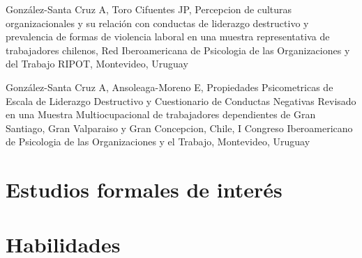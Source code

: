 \documentclass[11pt,a4paper,]{awesome-cv}
\begin{document}
\begin{cventries}
{\begin{cvitems}
\item González-Santa Cruz A, Toro Cifuentes JP, Percepcion de culturas organizacionales y su relación con conductas de liderazgo destructivo y prevalencia de formas de violencia laboral en una muestra representativa de trabajadores chilenos, Red Iberoamericana de Psicologia de las Organizaciones y del Trabajo RIPOT, Montevideo, Uruguay
\item González-Santa Cruz A, Ansoleaga-Moreno E, Propiedades Psicometricas de Escala de Liderazgo Destructivo y Cuestionario de Conductas Negativas Revisado en una Muestra Multiocupacional de trabajadores dependientes de Gran Santiago, Gran Valparaiso y Gran Concepcion, Chile, I Congreso Iberoamericano de Psicologia de las Organizaciones y el Trabajo, Montevideo, Uruguay
\end{cvitems}}
\end{cventries}

\hypertarget{estudios-formales-de-interuxe9s-1}{%
\section{Estudios formales de
interés}\label{estudios-formales-de-interuxe9s-1}}

\fontsize{10pt}{1.5em}\color{text}
\begin{cventries}
    \vspace{-4.0mm}
    \vspace{-4.0mm}
    \vspace{-4.0mm}
    \vspace{-4.0mm}
    \vspace{-4.0mm}
\end{cventries}

\hypertarget{habilidades-1}{%
\section{Habilidades}\label{habilidades-1}}
\end{document}
